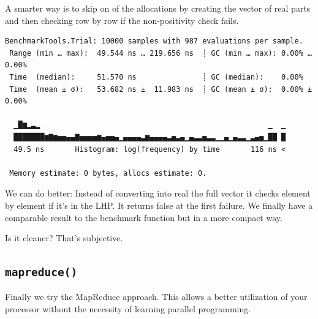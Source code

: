 \documentclass[
  8pt,
  a4paper,
]{book}
\newenvironment{Shaded}{\begin{snugshade}}{\end{snugshade}}
\newcommand{\FloatTok}[1]{\textcolor[rgb]{0.68,0.00,0.00}{#1}}
\newcommand{\FunctionTok}[1]{\textcolor[rgb]{0.28,0.35,0.67}{#1}}
\newcommand{\NormalTok}[1]{\textcolor[rgb]{0.00,0.23,0.31}{#1}}
\newcommand{\OperatorTok}[1]{\textcolor[rgb]{0.37,0.37,0.37}{#1}}
\newcommand{\PreprocessorTok}[1]{\textcolor[rgb]{0.68,0.00,0.00}{#1}}
\begin{document}
A smarter way is to skip on of the allocations by creating the vector of
real parts and then checking row by row if the non-positivity check
fails.

\begin{Shaded}
\end{Shaded}

\begin{verbatim}
BenchmarkTools.Trial: 10000 samples with 987 evaluations per sample.
 Range (min … max):  49.544 ns … 219.656 ns  ┊ GC (min … max): 0.00% … 0.00%
 Time  (median):     51.570 ns               ┊ GC (median):    0.00%
 Time  (mean ± σ):   53.682 ns ±  11.983 ns  ┊ GC (mean ± σ):  0.00% ± 0.00%

  ▁█▆▂▃▂                                                    ▁  ▁
  ███████▆▇▆▅▅▄▄▇▅▅▅▅▆▄▅▅▄▁▄▄▄▄▃▆▄▄▄▄▃▅▃▄▁▄▃▃▅▃▃▁▁▄▁▄▃▃▁▃▄▅▁██ █
  49.5 ns       Histogram: log(frequency) by time       116 ns <

 Memory estimate: 0 bytes, allocs estimate: 0.
\end{verbatim}

We can do better: Instead of converting into real the full vector it
checks element by element if it's in the LHP. It returns false at the
first failure. We finally have a comparable result to the benchmark
function but in a more compact way.

Is it cleaner? That's subjective.

\subsection{\texorpdfstring{\texttt{mapreduce()}}{mapreduce()}}\label{mapreduce}

Finally we try the MapReduce approach. This allows a better utilization
of your processor without the necessity of learning parallel
programming.

\begin{Shaded}
\end{Shaded}
\end{document}
